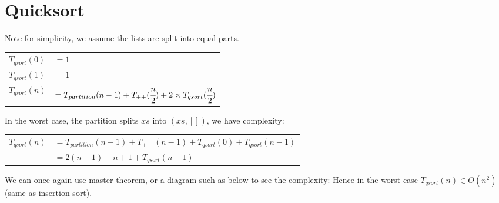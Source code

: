 \documentclass{report}
\begin{document}
    \section*{Quicksort}
        Note for simplicity, we assume the lists are split into equal parts.
        \\ \begin{tabular}{l l }
            $T_{qsort}(0) $ & $= 1$ \\
            $T_{qsort}(1) $ & $= 1$ \\
            $T_{qsort}(n) $ & $= T_{partition}(n-1) + T_{++}(\cfrac{n}{2}) + 2 \times T_{qsort}(\cfrac{n}{2})$ \\
        \end{tabular}
        In the worst case, the partition splits $xs$ into $(xs, [])$, we have complexity:
        \\ \begin{tabular}{l l }
            $T_{qsort}(n) $ & $= T_{partition}(n-1) + T_{++}(n-1) + T_{qsort}(0) + T_{qsort}(n-1)$ \\
            & $= 2(n-1) + n + 1 + T_{qsort}(n-1)$ \\
        \end{tabular}
        We can once again use master theorem, or a diagram such as below to see the complexity:
        Hence in the worst case $T_{qsort}(n) \in O(n^2)$ (same as insertion sort).
\end{document}
